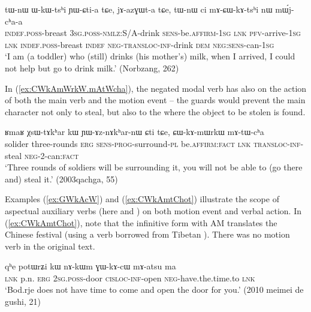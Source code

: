 \begin{exe}
\ex \label{ex:mACWkAtshi}
\gll  tɯ-nɯ ɯ-kɯ-tsʰi ɲɯ-ɕti-a tɕe, jɤ-azɣɯt-a tɕe, tɯ-nɯ ci mɤ-ɕɯ-kɤ-tsʰi nɯ mɯ́j-cʰa-a \\
\textsc{indef}.\textsc{poss}-breast \textsc{3sg}.\textsc{poss}-\textsc{nmlz}:S/A-drink \textsc{sens}-be.\textsc{affirm}-\textsc{1sg} \textsc{lnk} \textsc{pfv}-arrive-\textsc{1sg} \textsc{lnk} \textsc{indef}.\textsc{poss}-breast  \textsc{indef} \textsc{neg}-\textsc{transloc}-\textsc{inf}-drink \textsc{dem} \textsc{neg}:\textsc{sens}-can-\textsc{1sg} \\
\glt `I am (a toddler) who (still) drinks (his mother's) milk, when I arrived, I could not help but go to drink milk.'  (Norbzang, 262)
 \end{exe}
 
 In (\ref{ex:CWkAmWrkW.mAtWcha}), the negated modal verb has also on the action of both the main verb and the motion event -- the guards would prevent the main character not only to steal, but also to the where the object to be stolen is found. 
 
\begin{exe}
\ex \label{ex:CWkAmWrkW.mAtWcha}
\gll ʁmaʁ χsɯ-tɤkʰar kɯ ɲɯ-ɤz-nɤkʰar-nɯ ɕti tɕe, ɕɯ-kɤ-mɯrkɯ mɤ-tɯ-cʰa  \\
solider three-rounds \textsc{erg} \textsc{sens}-\textsc{prog}-surround-\textsc{pl} be.\textsc{affirm}:\textsc{fact} \textsc{lnk}  \textsc{transloc}-\textsc{inf}-steal \textsc{neg}-2-can:\textsc{fact} \\
\glt `Three rounds of soldiers will be surrounding it, you will not be able to (go there and) steal it.' (2003qachga, 55)
   \end{exe}
   
 Examples (\ref{ex:GWkAcW}) and (\ref{ex:CWkAmtChot}) illustrate the scope of aspectual  auxiliary verbs (here   and ) on both motion event and verbal action.  In (\ref{ex:CWkAmtChot}), note that the infinitive form with AM   translates the Chinese festival  (using a verb borrowed from Tibetan  ). There was no motion verb in the original text.
 
\begin{exe}
\ex \label{ex:GWkAcW}
\gll qʰe potɯrʑi kɯ nɤ-kɯm ɣɯ-kɤ-cɯ mɤ-atsu ma \\
\textsc{lnk} p.n. \textsc{erg} \textsc{2sg}.\textsc{poss}-door \textsc{cisloc}-\textsc{inf}-open \textsc{neg}-have.the.time.to \textsc{lnk} \\
\glt `Bod.rje does not have time to come and open the door for you.' (2010 meimei de gushi, 21)
\end{exe} 
  

